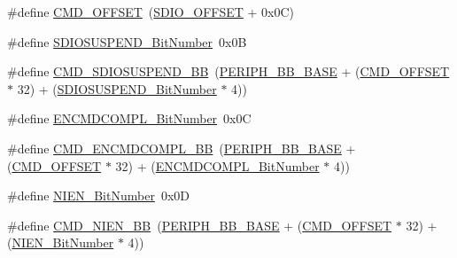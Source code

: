 \begin{DoxyCompactItemize}
\item 
\#define \hyperlink{group___s_d_i_o___private___types_definitions_gaf12d26702ce7a88d2a3dae87f000b75e}{C\+M\+D\+\_\+\+O\+F\+F\+S\+ET}~(\hyperlink{openmotestm_2library_2src_2stm32f10x__sdio_8c_abf07aced03df5f46d57cea1d4f56d1e3}{S\+D\+I\+O\+\_\+\+O\+F\+F\+S\+ET} + 0x0\+C)
\item 
\#define \hyperlink{group___s_d_i_o___private___types_definitions_gaf88f03a42d76974b55dfb8bda65ade97}{S\+D\+I\+O\+S\+U\+S\+P\+E\+N\+D\+\_\+\+Bit\+Number}~0x0B
\item 
\#define \hyperlink{group___s_d_i_o___private___types_definitions_ga931e48aa282e2a937308f57f807e0781}{C\+M\+D\+\_\+\+S\+D\+I\+O\+S\+U\+S\+P\+E\+N\+D\+\_\+\+BB}~(\hyperlink{openmotestm_2library_2inc_2stm32f10x__map_8h_aed7efc100877000845c236ccdc9e144a}{P\+E\+R\+I\+P\+H\+\_\+\+B\+B\+\_\+\+B\+A\+SE} + (\hyperlink{openmotestm_2library_2src_2stm32f10x__sdio_8c_af12d26702ce7a88d2a3dae87f000b75e}{C\+M\+D\+\_\+\+O\+F\+F\+S\+ET} $\ast$ 32) + (\hyperlink{openmotestm_2library_2src_2stm32f10x__sdio_8c_af88f03a42d76974b55dfb8bda65ade97}{S\+D\+I\+O\+S\+U\+S\+P\+E\+N\+D\+\_\+\+Bit\+Number} $\ast$ 4))
\item 
\#define \hyperlink{group___s_d_i_o___private___types_definitions_ga1d1112c7b804791a0fffd8b317085aeb}{E\+N\+C\+M\+D\+C\+O\+M\+P\+L\+\_\+\+Bit\+Number}~0x0C
\item 
\#define \hyperlink{group___s_d_i_o___private___types_definitions_gade06098d1616639ce5f1b70675280b7c}{C\+M\+D\+\_\+\+E\+N\+C\+M\+D\+C\+O\+M\+P\+L\+\_\+\+BB}~(\hyperlink{openmotestm_2library_2inc_2stm32f10x__map_8h_aed7efc100877000845c236ccdc9e144a}{P\+E\+R\+I\+P\+H\+\_\+\+B\+B\+\_\+\+B\+A\+SE} + (\hyperlink{openmotestm_2library_2src_2stm32f10x__sdio_8c_af12d26702ce7a88d2a3dae87f000b75e}{C\+M\+D\+\_\+\+O\+F\+F\+S\+ET} $\ast$ 32) + (\hyperlink{openmotestm_2library_2src_2stm32f10x__sdio_8c_a1d1112c7b804791a0fffd8b317085aeb}{E\+N\+C\+M\+D\+C\+O\+M\+P\+L\+\_\+\+Bit\+Number} $\ast$ 4))
\item 
\#define \hyperlink{group___s_d_i_o___private___types_definitions_gab6d83a7ccd4a0d9ea9a09fec263fb25f}{N\+I\+E\+N\+\_\+\+Bit\+Number}~0x0D
\item 
\#define \hyperlink{group___s_d_i_o___private___types_definitions_ga08623f1d053677de8b20a6f5f5090edd}{C\+M\+D\+\_\+\+N\+I\+E\+N\+\_\+\+BB}~(\hyperlink{openmotestm_2library_2inc_2stm32f10x__map_8h_aed7efc100877000845c236ccdc9e144a}{P\+E\+R\+I\+P\+H\+\_\+\+B\+B\+\_\+\+B\+A\+SE} + (\hyperlink{openmotestm_2library_2src_2stm32f10x__sdio_8c_af12d26702ce7a88d2a3dae87f000b75e}{C\+M\+D\+\_\+\+O\+F\+F\+S\+ET} $\ast$ 32) + (\hyperlink{openmotestm_2library_2src_2stm32f10x__sdio_8c_ab6d83a7ccd4a0d9ea9a09fec263fb25f}{N\+I\+E\+N\+\_\+\+Bit\+Number} $\ast$ 4))

\end{DoxyCompactItemize}
